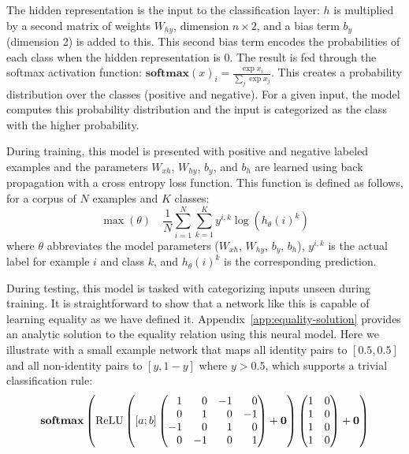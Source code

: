 \documentclass{article}
\newcommand{\Appref}[1]{Appendix~\ref{#1}}
\newcommand{\update}[1]{#1}
\newcommand{\softmax}{\mathbf{softmax}}
\DeclareMathOperator{\ReLU}{ReLU}
\begin{document}
The hidden representation is the input to the classification layer: $h$ is multiplied by a second matrix of weights $W_{hy}$, dimension $n \times 2$, and a bias term $b_{y}$ (dimension 2) is added to this. This second bias term encodes the probabilities of each class when the hidden representation is 0. The result is fed through the softmax activation function: $\softmax(x)_{i} = \frac{\exp{x_{i}}}{\sum_{j} \exp{x_{j}}}$. This creates a probability distribution over the classes (positive and negative). For a given input, the model computes this probability distribution and the input is categorized as the class with the higher probability.

During training, this model is presented with positive and negative labeled examples and the parameters $W_{xh}$, $W_{hy}$, $b_{y}$, and $b_{h}$ are learned using back propagation with a cross entropy loss function. \update{This function is defined as follows, for a corpus of $N$ examples and $K$ classes:
%
\begin{equation}
\max(\theta)
\quad
\frac{1}{N}
\sum_{i=1}^{N}
\sum_{k=1}^{K}
y^{i,k} \log(h_{\theta}(i)^{k})
\end{equation}
%
where $\theta$ abbreviates the model parameters ($W_{xh}$, $W_{hy}$, $b_{y}$, $b_{h}$), $y^{i,k}$ is the actual label for example $i$ and class $k$, and $h_{\theta}(i)^{k}$ is the corresponding prediction.}

During testing, this model is tasked with categorizing inputs unseen during training. It is straightforward to show that a network like this is capable of learning equality as we have defined it. \Appref{app:equality-solution} provides an analytic solution to the equality relation using this neural model. \update{Here we illustrate with a small example network that maps all identity pairs to $[0.5, 0.5]$ and all non-identity pairs to $[y, 1-y]$ where $y > 0.5$, which supports a trivial classification rule:
%
\setlength{\arraycolsep}{4pt}
\begin{equation}
\softmax\left(
  \ReLU\left(
    [a;b]
    \left(
      \begin{array}[c]{@{} *{4}{r} @{}}
        1 & 0 & -1 & 0 \\
        0 & 1 & 0 & -1 \\
        -1 & 0 & 1 & 0 \\
        0 & -1 & 0 & 1
      \end{array}
    \right)
    +
    \mathbf{0}
  \right)
  \left(
    \begin{array}[c]{@{} r r @{}}
      1 & 0 \\
      1 & 0\\
      1 & 0\\
      1 & 0\\
    \end{array}
  \right)
  +
  \mathbf{0}
\right)
\end{equation}}
\end{document}
